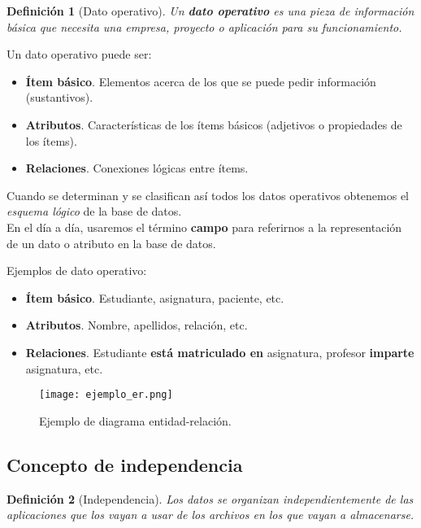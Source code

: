 \documentclass[12pt,spanish]{article}
\newtheorem{definition}{Definición}
\begin{document}
\begin{definition}[Dato operativo]
Un \textbf{dato operativo} es una pieza de información básica que necesita una empresa, proyecto o aplicación para su funcionamiento.
\end{definition}

Un dato operativo puede ser:
\begin{itemize}
	\item \textbf{Ítem básico}. Elementos acerca de los que se puede pedir información (sustantivos).
	\item \textbf{Atributos}. Características de los ítems básicos (adjetivos o propiedades de los ítems).
	\item \textbf{Relaciones}. Conexiones lógicas entre ítems.
\end{itemize}

Cuando se determinan y se clasifican así todos los datos operativos obtenemos el \emph{esquema lógico} de la base de datos.\\

En el día a día, usaremos el término \textbf{campo} para referirnos a la representación de un dato o atributo en la base de datos.

Ejemplos de dato operativo:

\begin{itemize}
	\item \textbf{Ítem básico}. Estudiante, asignatura, paciente, etc.
	\item \textbf{Atributos}. Nombre, apellidos, relación, etc.
	\item \textbf{Relaciones}. Estudiante \textbf{está matriculado en} asignatura, profesor \textbf{imparte} asignatura, etc.
\end{itemize}

\begin{figure}[H]
\centering
\texttt{[image: ejemplo\_er.png]}
\caption{Ejemplo de diagrama entidad-relación.}
\end{figure}

\subsection{Concepto de independencia}

\begin{definition}[Independencia]
	Los datos se organizan independientemente de las aplicaciones que los vayan a usar de los archivos en los que vayan a almacenarse.
\end{definition}
\end{document}
